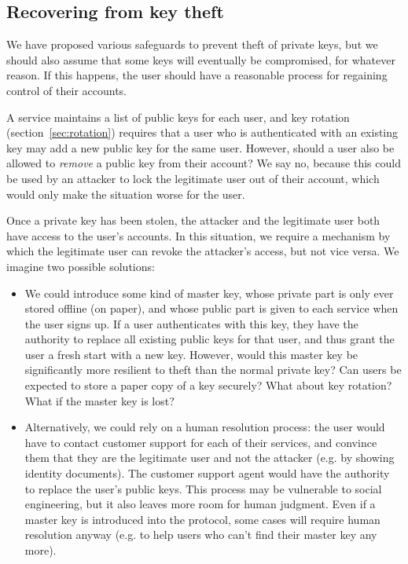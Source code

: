 \subsection{Recovering from key theft}\label{sec:recovery}

We have proposed various safeguards to prevent theft of private keys, but we should also assume that
some keys will eventually be compromised, for whatever reason. If this happens, the user should have
a reasonable process for regaining control of their accounts.

A service maintains a list of public keys for each user, and key rotation
(section~\ref{sec:rotation}) requires that a user who is authenticated with an existing key may add
a new public key for the same user. However, should a user also be allowed to \emph{remove} a public
key from their account? We say no, because this could be used by an attacker to lock the legitimate
user out of their account, which would only make the situation worse for the user.

Once a private key has been stolen, the attacker and the legitimate user both have access to the
user's accounts. In this situation, we require a mechanism by which the legitimate user can revoke
the attacker's access, but not vice versa. We imagine two possible solutions:

\begin{itemize}
\item We could introduce some kind of master key, whose private part is only ever stored offline (on
paper), and whose public part is given to each service when the user signs up. If a user
authenticates with this key, they have the authority to replace all existing public keys for that
user, and thus grant the user a fresh start with a new key. However, would this master key be
significantly more resilient to theft than the normal private key? Can users be expected to store a
paper copy of a key securely? What about key rotation? What if the master key is lost?
\item Alternatively, we could rely on a human resolution process: the user would have to contact
customer support for each of their services, and convince them that they are the legitimate user and
not the attacker (e.g. by showing identity documents). The customer support agent would have the
authority to replace the user's public keys. This process may be vulnerable to social engineering,
but it also leaves more room for human judgment. Even if a master key is introduced into the
protocol, some cases will require human resolution anyway (e.g. to help users who can't find their
master key any more).
\end{itemize}

